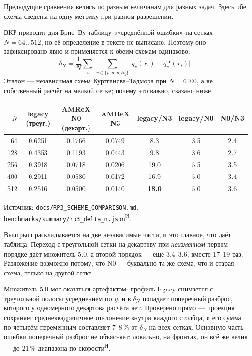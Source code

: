 \documentclass[12pt,a4paper]{article}
\newcommand{\code}[1]{\texttt{#1}}
\newcommand{\Iz}{\textsuperscript{\scriptsize И}}    %
\begin{document}
Предыдущие сравнения велись по разным величинам для разных задач. Здесь обе
схемы сведены на одну метрику при равном разрешении.

ВКР приводит для Брио--Ву таблицу «усреднённой ошибки» на сетках $N=64\ldots512$,
но её определение в тексте не выписано. Поэтому оно зафиксировано явно и
применяется к обеим схемам одинаково:
\[
 \delta_N=\frac1N\sum_i\ \sum_{v\in\{\rho,u,p,B_y\}} \bigl|q_v(x_i)-q_v^{\text{эт}}(x_i)\bigr| .
\]
Эталон --- независимая схема Куртганова--Тадмора при $N=6400$, а не собственный
расчёт на мелкой сетке; почему это важно, сказано ниже.

\begin{center}\footnotesize\setlength{\tabcolsep}{5pt}
\begin{tabular}{rcccccc}
\toprule
$N$ & legacy (треуг.) & AMReX N0 (декарт.) & AMReX N3 & legacy/N3 & legacy/N0 & N0/N3 \\
\midrule
64  & 0.6251 & 0.1766 & 0.0749 & 8.3 & 3.5 & 2.4 \\
128 & 0.4353 & 0.1193 & 0.0443 & 9.8 & 3.6 & 2.7 \\
256 & 0.3918 & 0.0718 & 0.0206 & 19.0 & 5.5 & 3.5 \\
400 & 0.2911 & 0.0580 & 0.0172 & 16.9 & 5.0 & 3.4 \\
512 & 0.2516 & 0.0500 & 0.0140 & \textbf{18.0} & 5.0 & 3.6 \\
\bottomrule
\end{tabular}
\end{center}
\noindent\footnotesize
Источник: \code{docs/RP3\_SCHEME\_COMPARISON.md},
\code{benchmarks/summary/rp3\_delta\_n.json}\Iz.\normalsize

\medskip
Выигрыш раскладывается на две независимые части, и это главное, что даёт
таблица. Переход с треугольной сетки на декартову при \emph{неизменном} первом
порядке даёт множитель 5.0, а второй порядок --- ещё 3.4--3.6; вместе 17--19 раз.
Разложение возможно потому, что N0 --- буквально та же схема, что и
старая схема, только на другой сетке.

Множитель 5.0 мог оказаться артефактом: профиль legacy снимается с треугольной
полосы усреднением по $y$, и в $\delta_N$ попадает поперечный разброс, которого
у одномерного декартова расчёта нет. Проверено прямо --- проекция сохраняет
среднеквадратичное отклонение внутри каждого столбца, и его сумма по четырём
переменным составляет $7\text{--}8\,\%$ от $\delta_N$ на всех сетках. Основную
часть ошибки поперечный разброс не объясняет; локально, на фронтах, он всё же
велик --- до $21\,\%$ диапазона по скорости\Iz.
\end{document}
